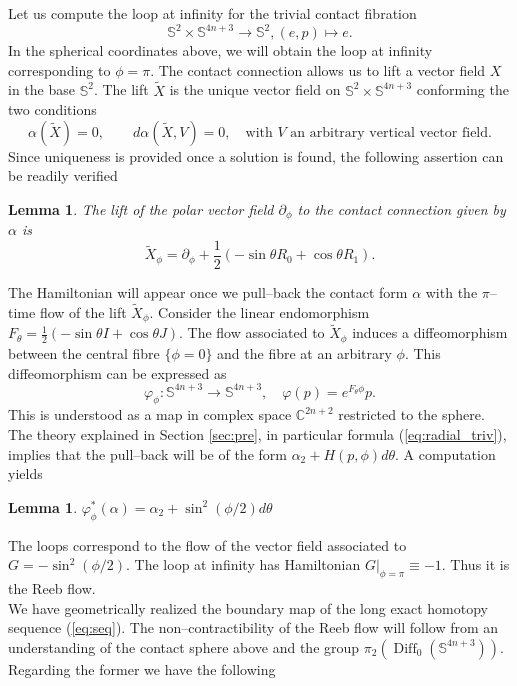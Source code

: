 \documentclass[10pt]{amsart}
\newtheorem{lemma}[proposition]{Lemma}
\begin{document}
\noindent Let us compute the loop at infinity for the trivial contact fibration
$${\mathbb{S}}^2\times{\mathbb{S}}^{4n+3}\longrightarrow{\mathbb{S}}^{2}, (e,p)\longmapsto e.$$
In the spherical coordinates above, we will obtain the loop at infinity corresponding to $\phi=\pi$. The contact connection allows us to lift a vector field $X$ in the base ${\mathbb{S}}^2$. The lift $\widetilde{X}$ is the unique vector field on ${\mathbb{S}}^2\times{\mathbb{S}}^{4n+3}$ conforming the two conditions
$$\alpha(\widetilde{X})=0,\qquad d\alpha(\widetilde{X},V)=0,\quad\mbox{with }V\mbox{ an arbitrary vertical vector field}.$$
Since uniqueness is provided once a solution is found, the following assertion can be readily verified
\begin{lemma}
The lift of the polar vector field $\partial_\phi$ to the contact connection given by $\alpha$ is
$$\widetilde{X}_\phi=\partial_\phi+\frac{1}{2}\left(-\sin\theta R_0+\cos\theta R_1\right).$$
\end{lemma}
\noindent The Hamiltonian will appear once we pull--back the contact form $\alpha$ with the $\pi$--time flow of the lift $\widetilde{X}_\phi$. Consider the linear endomorphism $F_\theta=\frac{1}{2}\left(-\sin\theta I+\cos\theta J\right)$. The flow associated to $\widetilde{X}_\phi$ induces a diffeomorphism between the central fibre $\{\phi=0\}$ and the fibre at an arbitrary $\phi$. This diffeomorphism can be expressed as
$$\varphi_\phi:{\mathbb{S}}^{4n+3}\longrightarrow{\mathbb{S}}^{4n+3},\quad \varphi(p)=e^{F_\theta\phi}p.$$
This is understood as a map in complex space ${\mathbb{C}}^{2n+2}$ restricted to the sphere. The theory explained in Section \ref{sec:pre}, in particular formula (\ref{eq:radial_triv}), implies that the pull--back will be of the form $\alpha_2+H(p,\phi)d\theta$. A computation yields
\begin{lemma}
$\varphi_\phi^*(\alpha)=\alpha_2+\sin^2(\phi/2)d\theta$
\end{lemma}
\noindent The loops correspond to the flow of the vector field associated to $G=-\sin^2(\phi/2)$. The loop at infinity has Hamiltonian $G|_{\phi=\pi}\equiv-1$. Thus it is the Reeb flow.\\

\noindent We have geometrically realized the boundary map of the long exact homotopy sequence (\ref{eq:seq}). The non--contractibility of the Reeb flow will follow from an understanding of the contact sphere above and the group $\pi_2({\operatorname{Diff}}_0({\mathbb{S}}^{4n+3}))$. Regarding the former we have the following
\end{document}
